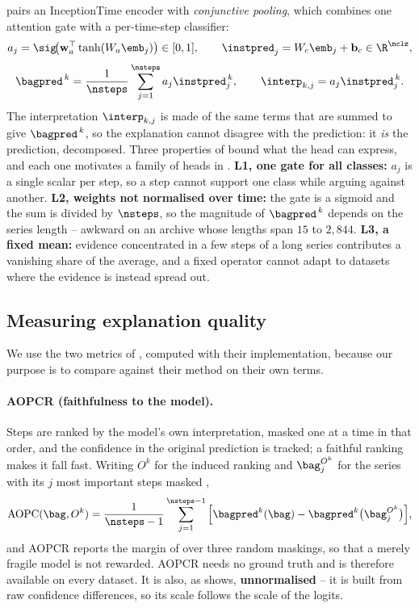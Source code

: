 \millet{} \citep{early2024millet} pairs an InceptionTime encoder \citep{fawaz2020inceptiontime} with
\emph{conjunctive pooling}, which combines one attention gate with a per-time-step classifier:
\begin{equation}
  a_j = \sig\!\big(\mathbf{w}_a^\top \tanh(W_a \emb_j)\big) \in [0,1],
  \qquad
  \instpred_j = W_c \emb_j + \mathbf{b}_c \in \R^{\nclz},
  \label{eq:conj_gate}
\end{equation}
\begin{equation}
  \bagpred^{\,k} = \frac{1}{\nsteps}\sum_{j=1}^{\nsteps} a_j \instpred_j^{\,k},
  \qquad
  \interp_{k,j} = a_j \instpred_j^{\,k} .
  \label{eq:conj_bag}
\end{equation}
The interpretation $\interp_{k,j}$ is made of the same terms that are summed to give
$\bagpred^{\,k}$, so the explanation cannot disagree with the prediction: it \emph{is} the
prediction, decomposed. Three properties of  bound what the head can express, and
each one motivates a family of heads in . \textbf{L1, one gate for all classes:}
$a_j$ is a single scalar per step, so a step cannot support one class while arguing against another.
\textbf{L2, weights not normalised over time:} the gate is a sigmoid and the sum is divided by
$\nsteps$, so the magnitude of $\bagpred^{\,k}$ depends on the series length -- awkward on an archive
whose lengths span $15$ to $2{,}844$. \textbf{L3, a fixed mean:} evidence concentrated in a few steps
of a long series contributes a vanishing share of the average, and a fixed operator cannot adapt to
datasets where the evidence is instead spread out.

\subsection{Measuring explanation quality}
\label{sec:bg:metrics}

We use the two metrics of \citet{early2024millet}, computed with their implementation, because our
purpose is to compare against their method on their own terms.

\paragraph{AOPCR (faithfulness to the model).}
Steps are ranked by the model's own interpretation, masked one at a time in that order, and the
confidence in the original prediction is tracked; a faithful ranking makes it fall fast. Writing
$O^k$ for the induced ranking and $\bag^{O^k}_j$ for the series with its $j$ most important steps
masked \citep{samek2017aopc},
\begin{equation}
  \mathrm{AOPC}(\bag, O^k) = \frac{1}{\nsteps-1}\sum_{j=1}^{\nsteps-1}
  \Big[\bagpred^{k}(\bag) - \bagpred^{k}\big(\bag^{O^k}_{j}\big)\Big],
  \label{eq:aopc}
\end{equation}
and AOPCR reports the margin of  over three random maskings, so that a merely fragile
model is not rewarded. AOPCR needs no ground truth and is therefore available on every dataset. It
is also, as  shows, \textbf{unnormalised} -- it is built from raw confidence
differences, so its scale follows the scale of the logits.

